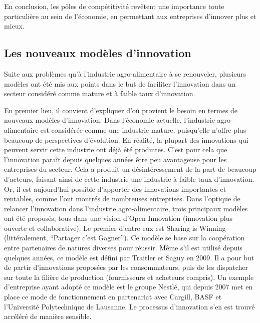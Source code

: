 \documentclass[a4paper,12pt]{report}
\begin{document}
		En conclusion, les pôles de compétitivité revêtent une importance toute particulière au sein de l’économie, en permettant aux entreprises d’innover plus et mieux.
				
		\subsection{Les nouveaux modèles d’innovation}
			Suite aux problèmes qu’à l’industrie agro-alimentaire à se renouveler, plusieurs modèles ont été mis aux points dans le but de faciliter l’innovation dans un secteur considéré comme mature et à faible taux d’innovation.
			
			En premier lieu, il convient d’expliquer d’où provient le besoin en termes de nouveaux modèles d’innovation. Dans l’économie actuelle, l’industrie agro-alimentaire est considérée comme une industrie mature, puisqu’elle n’offre plus beaucoup de perspectives d’évolution. En réalité, la plupart des innovations qui peuvent servir cette industrie ont déjà été produites. C’est pour cela que l’innovation paraît depuis quelques années être peu avantageuse pour les entreprises du secteur. Cela a produit un désintéressement de la part de beaucoup d’acteurs, faisant ainsi de cette industrie une industrie à faible taux d’innovation. Or, il est aujourd’hui possible d’apporter des innovations importantes et rentables, comme l’ont montrés de nombreuses entreprises.
			Dans l’optique de relancer l’innovation dans l’industrie agro-alimentaire, trois principaux modèles ont été proposés, tous dans une vision d’Open Innovation (innovation plus ouverte et collaborative)\cite{OpenInnovation}. Le premier d’entre eux est Sharing is Winning (littéralement, “Partager c’est Gagner”)\cite{SiW}. Ce modèle se base sur la coopération entre partenaires de natures diverses pour réussir. Même s’il est utilisé depuis quelques années, ce modèle est défini par Traitler et Saguy en 2009. Il a pour but de partir d’innovations proposées par les consommateurs, puis de les dispatcher sur toute la filière de production (fournisseurs et acheteurs compris)\cite{OIFr}. Un exemple d’entreprise ayant adopté ce modèle est le groupe Nestlé\cite{NestleOI}, qui depuis 2007 met en place ce mode de fonctionnement en partenariat avec Cargill, BASF et l'Université Polytechnique de Lausanne. Le processus d’innovation s’en est trouvé accéléré de manière sensible.	
			
\end{document}
